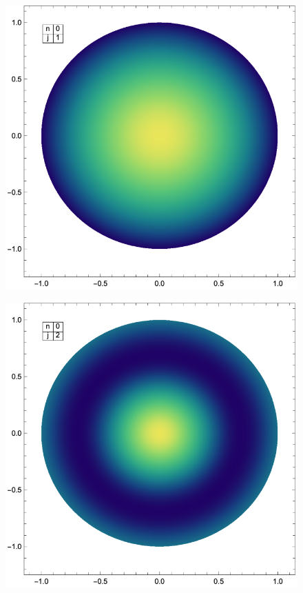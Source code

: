 \begin{minipage}{0.3\linewidth}
\begin{figure}[H]
    \centering
    \includegraphics[scale=0.5]{Imagenes/Vibracion_Membrana_01.eps}
\end{figure}
\end{minipage}
\begin{minipage}{0.3\linewidth}
\begin{figure}[H]
    \centering
    \includegraphics[scale=0.5]{Imagenes/Vibracion_Membrana_02.eps}
\end{figure}
\end{minipage}
